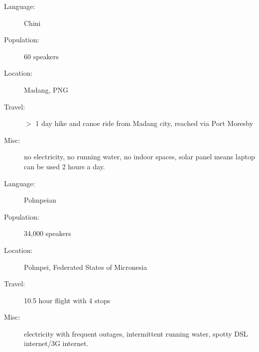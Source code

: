 \documentclass{article}
\begin{document}
\hrulefill
\bigskip

\begin{description}
\item[Language:] Chini
\item[Population:] 60 speakers
\item[Location:] Madang, PNG
\item[Travel:] $>$ 1 day hike and canoe ride from Madang city, reached via Port Moresby 
\item[Misc:] no electricity, no running water, no indoor spaces, solar panel means laptop can be used 2 hours a day.  
\end{description}


\hrulefill
\bigskip

\begin{description}
\item[Language:] Pohnpeian
\item[Population:] 34,000 speakers
\item[Location:] Pohnpei, Federated States of Micronesia
\item[Travel:] 10.5 hour flight with 4 stops 
\item[Misc:] electricity with frequent outages, intermittent running water, spotty DSL internet/3G internet.  
\end{description}
\end{document}

